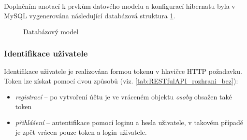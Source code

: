 \documentclass[thesis=B,czech]{FITthesis}[2012/06/26]
\begin{document}
Doplněním anotací k prvkům datového modelu a konfigurací hibernatu byla v MySQL vygenerována následující databázová struktura \ref{fig:gtd_database_model}.

\begin{figure}
	\caption{Databázový model}\label{fig:gtd_database_model}
\end{figure}


\subsubsection{Identifikace uživatele}

Identifikace uživatele je realizována formou tokenu v hlavičce HTTP požadavku. Token lze získat pomocí dvou způsobů (viz. \ref{tab:RESTfulAPI_rozhrani_bez}):
\begin{itemize}[nosep]
	\item \textit{registrací} -- po vytvoření účtu je ve vráceném objektu \textit{osoby} obsažen také token
	\item \textit{přihlášení} -- autentifikace pomocí loginu a hesla uživatele, v takovém případě je zpět vrácen pouze token a login uživatele.
\end{itemize}
\end{document}
